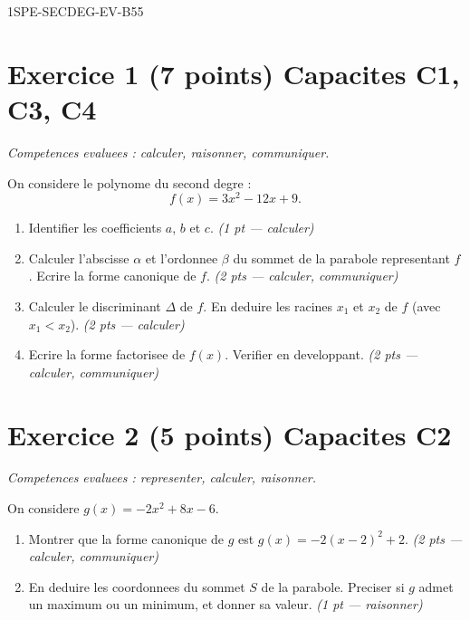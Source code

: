 \begin{evaluation}{1SPE-SECDEG-EV-B}{55}

\section*{Exercice 1 \hfill (7 points) \hfill Capacites C1, C3, C4}

\textit{Competences evaluees : calculer, raisonner, communiquer.}

\medskip
On considere le polynome du second degre :
\[
  f(x) = 3x^2 - 12x + 9.
\]

\begin{enumerate}
  \item Identifier les coefficients $a$, $b$ et $c$.
  \hfill\textit{(1 pt — calculer)}

  \item Calculer l'abscisse $\alpha$ et l'ordonnee $\beta$ du sommet de la parabole representant $f$.
  Ecrire la forme canonique de $f$.
  \hfill\textit{(2 pts — calculer, communiquer)}

  \item Calculer le discriminant $\Delta$ de $f$. En deduire les racines $x_1$ et $x_2$ de $f$ (avec $x_1 < x_2$).
  \hfill\textit{(2 pts — calculer)}

  \item Ecrire la forme factorisee de $f(x)$.
  Verifier en developpant.
  \hfill\textit{(2 pts — calculer, communiquer)}
\end{enumerate}

\section*{Exercice 2 \hfill (5 points) \hfill Capacites C2}

\textit{Competences evaluees : representer, calculer, raisonner.}

\medskip
On considere $g(x) = -2x^2 + 8x - 6$.

\begin{enumerate}
  \item Montrer que la forme canonique de $g$ est $g(x) = -2(x-2)^2 + 2$.
  \hfill\textit{(2 pts — calculer, communiquer)}

  \item En deduire les coordonnees du sommet $S$ de la parabole.
  Preciser si $g$ admet un maximum ou un minimum, et donner sa valeur.
  \hfill\textit{(1 pt — raisonner)}


\end{enumerate}
\end{evaluation}
